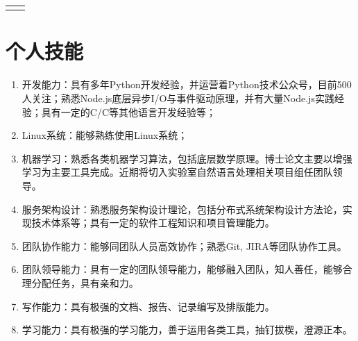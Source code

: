 \documentclass[10pt]{article} %
\def\CPP{{C\nolinebreak[4]\hspace{-.05em}\raisebox{.4ex}{\tiny\bf ++}}}
\begin{document}
\begin{paracol}{2}
	
	
	
	\begin{supertabular}{rl} %
		
		
		
		
		
		
		
		
	\end{supertabular}
	
	\medskip

	\section{个人技能}
	
	\begin{enumerate}
		\item 开发能力：具有多年Python开发经验，并运营着Python技术公众号，目前500人关注；熟悉Node.js底层异步I/O与事件驱动原理，并有大量Node.js实践经验；具有一定的C/\CPP 等其他语言开发经验等；
		\item Linux系统：能够熟练使用Linux系统；
		\item 机器学习：熟悉各类机器学习算法，包括底层数学原理。博士论文主要以增强学习为主要工具完成。近期将切入实验室自然语言处理相关项目组任团队领导。
		\item 服务架构设计：熟悉服务架构设计理论，包括分布式系统架构设计方法论，实现技术体系等；具有一定的软件工程知识和项目管理能力。
		\item 团队协作能力：能够同团队人员高效协作；熟悉Git, JIRA等团队协作工具。
		\item 团队领导能力：具有一定的团队领导能力，能够融入团队，知人善任，能够合理分配任务，具有亲和力。
		\item 写作能力：具有极强的文档、报告、记录编写及排版能力。
		\item 学习能力：具有极强的学习能力，善于运用各类工具，抽钉拔楔，澄源正本。
	\end{enumerate}


\end{paracol}
\end{document}
